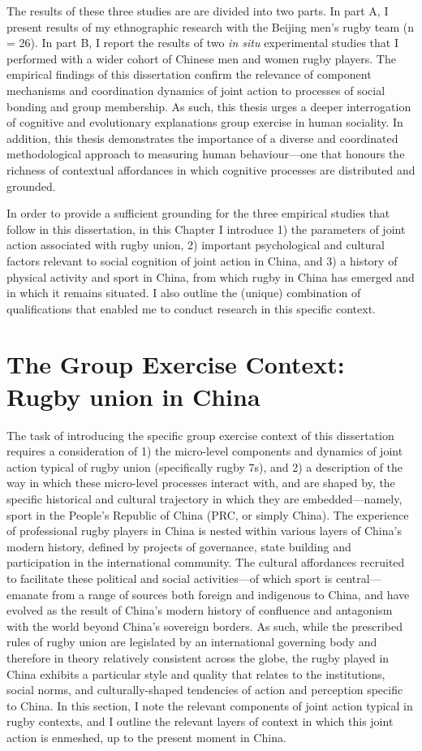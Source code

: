 \begin{CJK}{UTF8}{gbsn}
The results of these three studies are are divided into two parts. In part A, I present results of my ethnographic research with the Beijing men's rugby team (n = 26).  In part B, I report the results of two \textit{in situ} experimental studies that I performed with a wider cohort of Chinese men and women rugby players.  The empirical findings of this dissertation confirm the relevance of component mechanisms and coordination dynamics of joint action to processes of social bonding and group membership. As such, this thesis urges a deeper interrogation of cognitive and evolutionary explanations group exercise in human sociality. In addition, this thesis demonstrates the importance of a diverse and coordinated methodological approach to measuring human behaviour---one that honours the richness of contextual affordances in which cognitive processes are distributed and grounded.

In order to provide a sufficient grounding for the three empirical studies that follow in this dissertation, in this Chapter I introduce 1) the parameters of joint action associated with rugby union, 2) important psychological and cultural factors relevant to social cognition of joint action in China, and 3) a history of physical activity and sport in China, from which rugby in China has emerged and in which it remains situated. I also outline the (unique) combination of qualifications that enabled me to conduct research in this specific context.

\section{The Group Exercise Context: Rugby union in China}
The task of introducing the specific group exercise context of this dissertation requires a consideration of 1) the micro-level components and dynamics of joint action typical of rugby union (specifically rugby 7s), and 2) a description of the way in which these micro-level processes interact with, and are shaped by, the specific historical and cultural trajectory in which they are embedded---namely, sport in the People's Republic of China (PRC, or simply China).  The experience of professional rugby players in China is nested within various layers of China's modern history, defined by projects of governance, state building and participation in the international community.  The cultural affordances recruited to facilitate these political and social activities---of which sport is central---emanate from a range of sources both foreign and indigenous to China, and have evolved as the result of China's modern history of confluence and antagonism with the world beyond China's sovereign borders.  As such, while the prescribed rules of rugby union are legislated by an international governing body and therefore in theory relatively consistent across the globe, the rugby played in China exhibits a particular style and quality that relates to the institutions, social norms, and culturally-shaped tendencies of action and perception specific to China. In this section, I note the relevant components of joint action typical in rugby contexts, and I outline the relevant layers of context in which this joint action is enmeshed, up to the present moment in China.


\end{CJK}
